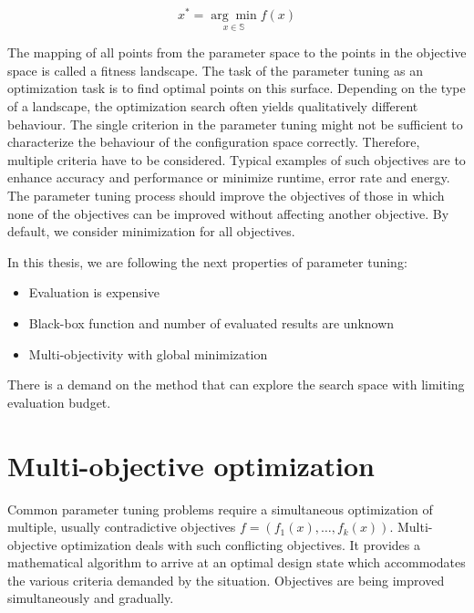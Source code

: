                 \[x^* = \underset{x \in \mathbb{S}}{\arg\min} f(x)\]


        The mapping of all points from the parameter space to the points in the objective space is called a fitness landscape. The task of the parameter tuning as an optimization task is to find optimal points on this surface. Depending on the type of a landscape, the optimization search often yields qualitatively different behaviour.
        The single criterion in the parameter tuning might not be sufficient to characterize the behaviour of the configuration space correctly. Therefore, multiple criteria have to be considered. Typical examples of such objectives are to enhance accuracy and performance or minimize runtime, error rate and energy. The parameter tuning process should improve the objectives of those in which none of the objectives can be improved without affecting another objective. By default, we consider minimization for all objectives. 

        In this thesis, we are following the next properties of parameter tuning:
        \begin{itemize}
            \item Evaluation is expensive
            \item Black-box function and number of evaluated results are unknown
            \item Multi-objectivity with global minimization
        \end{itemize}

        There is a demand on the method that can explore the search space with limiting evaluation budget. 
    

    \section{Multi-objective optimization}
        Common parameter tuning problems require a simultaneous optimization of multiple, usually contradictive objectives $f = (f_1(x), \ldots, f_k(x))$. Multi-objective optimization deals with such conflicting objectives. It provides a mathematical algorithm to arrive at an optimal design state which accommodates the various criteria demanded by the situation. Objectives are being improved simultaneously and gradually.

